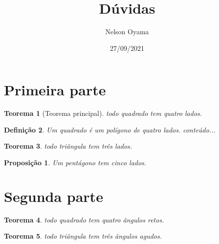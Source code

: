 \documentclass[a4paper]{article}
\author{Nelson Oyama}
\title{Dúvidas}
\date{27/09/2021}
\newtheorem{teorema}{Teorema}[section]
\newtheorem{definicao}[teorema]{Definição}
\newtheorem{proposicao}{Proposição}[section]
\begin{document}
	\maketitle
	\section{Primeira parte}
	\begin{teorema}[Teorema principal]
		todo quadrado tem quatro lados.
	\end{teorema}
	\begin{definicao}
		Um quadrado é um polígono de quatro lados.
		conteúdo...
	\end{definicao}
		\begin{teorema}
		todo triângula tem três lados.
	\end{teorema}
	\begin{proposicao}
	Um pentágono tem cinco lados.
	\end{proposicao}
	\section{Segunda parte}
			\begin{teorema}
			todo quadrado tem quatro ângulos retos.
		\end{teorema}
		\begin{teorema}
			todo triângula tem três ângulos agudos.
		\end{teorema}
\end{document}
